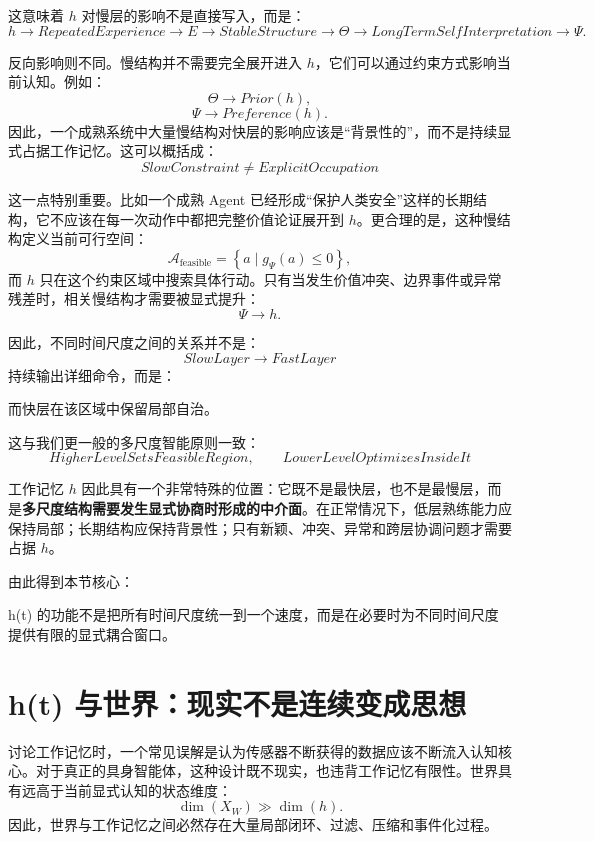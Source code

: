 这意味着 $h$ 对慢层的影响不是直接写入，而是：
\[
h
\rightarrow
RepeatedExperience
\rightarrow
E
\rightarrow
StableStructure
\rightarrow
\Theta
\rightarrow
LongTermSelfInterpretation
\rightarrow
\Psi.
\]

反向影响则不同。慢结构并不需要完全展开进入 $h$，它们可以通过约束方式影响当前认知。例如：
\[
\Theta
\rightarrow
Prior(h),
\]
\[
\Psi
\rightarrow
Preference(h).
\]
因此，一个成熟系统中大量慢结构对快层的影响应该是“背景性的”，而不是持续显式占据工作记忆。这可以概括成：
\[
\boxed{
SlowConstraint\neq ExplicitOccupation
}
\]

这一点特别重要。比如一个成熟 Agent 已经形成“保护人类安全”这样的长期结构，它不应该在每一次动作中都把完整价值论证展开到 $h$。更合理的是，这种慢结构定义当前可行空间：
\[
\mathcal A_{\mathrm{feasible}}
=
\left\{
a
\mid
g_\Psi(a)\leq 0
\right\},
\]
而 $h$ 只在这个约束区域中搜索具体行动。只有当发生价值冲突、边界事件或异常残差时，相关慢结构才需要被显式提升：
\[
\Psi
\rightarrow
h.
\]

因此，不同时间尺度之间的关系并不是：
\[
SlowLayer\to FastLayer
\]
持续输出详细命令，而是：
\begin{statementbox}
\centering
{}
\end{statementbox}
而快层在该区域中保留局部自治。

这与我们更一般的多尺度智能原则一致：
\[
\boxed{
HigherLevelSetsFeasibleRegion,\qquad
LowerLevelOptimizesInsideIt
}
\]

工作记忆 $h$ 因此具有一个非常特殊的位置：它既不是最快层，也不是最慢层，而是\textbf{多尺度结构需要发生显式协商时形成的中介面}。在正常情况下，低层熟练能力应保持局部；长期结构应保持背景性；只有新颖、冲突、异常和跨层协调问题才需要占据 $h$。

由此得到本节核心：
\begin{statementbox}
h(t) 的功能不是把所有时间尺度统一到一个速度，而是在必要时为不同时间尺度提供有限的显式耦合窗口。
\end{statementbox}

\section{h(t) 与世界：现实不是连续变成思想}

讨论工作记忆时，一个常见误解是认为传感器不断获得的数据应该不断流入认知核心。对于真正的具身智能体，这种设计既不现实，也违背工作记忆有限性。世界具有远高于当前显式认知的状态维度：
\[
\dim(X_W)
\gg
\dim(h).
\]
因此，世界与工作记忆之间必然存在大量局部闭环、过滤、压缩和事件化过程。

